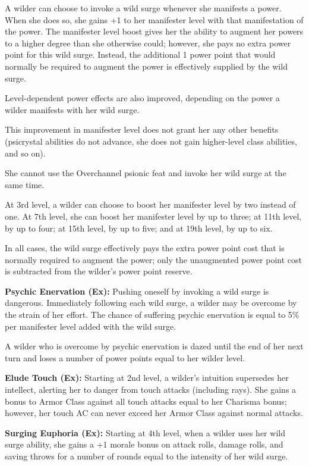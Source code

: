 \documentclass{article}
\begin{document}
A wilder can choose to invoke a wild surge whenever she manifests a power. When 
she does so, she gains +1 to her manifester level with that manifestation of the 
power. The manifester level boost gives her the ability to augment her powers to 
a higher degree than she otherwise could; however, she pays no extra power point 
for this wild surge. Instead, the additional 1 power point that would normally 
be required to augment the power is effectively supplied by the wild surge.

Level-dependent power effects are also improved, depending on the power a wilder 
manifests with her wild surge.

This improvement in manifester level does not grant her any other benefits (psicrystal 
abilities do not advance, she does not gain higher-level class abilities, and so 
on).

She cannot use the Overchannel psionic feat and invoke her wild surge at the same 
time.

At 3rd level, a wilder can choose to boost her manifester level by two instead 
of one. At 7th level, she can boost her manifester level by up to three; at 11th 
level, by up to four; at 15th level, by up to five; and at 19th level, by up to 
six.

In all cases, the wild surge effectively pays the extra power point cost that is 
normally required to augment the power; only the unaugmented power point cost is 
subtracted from the wilder's power point reserve.

\textbf{Psychic Enervation (Ex):} Pushing oneself by invoking a wild surge is dangerous. 
Immediately following each wild surge, a wilder may be overcome by the strain of 
her effort. The chance of suffering psychic enervation is equal to 5\% per manifester 
level added with the wild surge.

A wilder who is overcome by psychic enervation is dazed until the end of her next 
turn and loses a number of power points equal to her wilder level.

\textbf{Elude Touch (Ex):} Starting at 2nd level, a wilder's intuition supersedes 
her intellect, alerting her to danger from touch attacks (including rays). She 
gains a bonus to Armor Class against all touch attacks equal to her Charisma bonus; 
however, her touch AC can never exceed her Armor Class against normal attacks.

\textbf{Surging Euphoria (Ex):} Starting at 4th level, when a wilder uses her wild 
surge ability, she gains a +1 morale bonus on attack rolls, damage rolls, and saving 
throws for a number of rounds equal to the intensity of her wild surge. 
\end{document}
